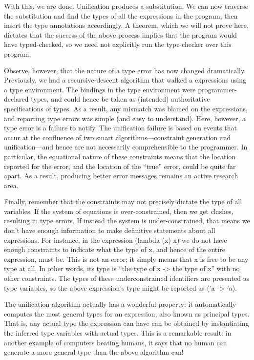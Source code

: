 With this, we are done. Unification produces a substitution. We can now traverse
the substitution and find the types of all the expressions in the program, then insert the
type annotations accordingly. A theorem, which we will not prove here, dictates that
the success of the above process implies that the program would have typed-checked,
so we need not explicitly run the type-checker over this program.

Observe, however, that the nature of a type error has now changed dramatically.
Previously, we had a recursive-descent algorithm that walked a expressions using a
type environment. The bindings in the type environment were programmer-declared
types, and could hence be taken as (intended) authoritative specifications of types.
As a result, any mismatch was blamed on the expressions, and reporting type errors
was simple (and easy to understand). Here, however, a type error is a failure to notify.
The unification failure is based on events that occur at the confluence of two
smart algorithms—constraint generation and unification—and hence are not necessarily
comprehensible to the programmer. In particular, the equational nature of these
constraints means that the location reported for the error, and the location of the “true”
error, could be quite far apart. As a result, producing better error messages remains an
active research area.

Finally, remember that the constraints may not precisely dictate the type of all
variables. If the system of equations is over-constrained, then we get clashes, resulting
in type errors. If instead the system is under-constrained, that means we don’t have
enough information to make definitive statements about all expressions. For instance,
in the expression (lambda (x) x) we do not have enough constraints to indicate what
the type of x, and hence of the entire expression, must be. This is not an error; it simply
means that x is free to be any type at all. In other words, its type is “the type of x -> the
type of x” with no other constraints. The types of these underconstrained identifiers are
presented as type variables, so the above expression’s type might be reported as ('a
-> 'a).

The unification algorithm actually has a wonderful property: it automatically computes
the most general types for an expression, also known as principal types. That is,
any actual type the expression can have can be obtained by instantiating the inferred
type variables with actual types. This is a remarkable result: in another example of
computers beating humans, it says that no human can generate a more general type
than the above algorithm can!

